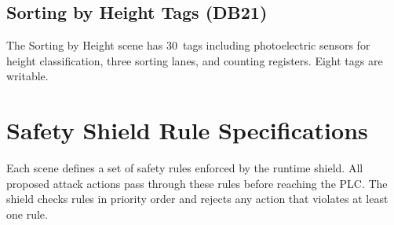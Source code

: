\subsection{Sorting by Height Tags (DB21)}
\label{subsec:appendix-tags-height}

The Sorting by Height scene has 30~tags including photoelectric sensors for height classification, three sorting lanes, and counting registers. Eight tags are writable.


\section{Safety Shield Rule Specifications}
\label{sec:appendix-shield}

Each scene defines a set of safety rules enforced by the runtime shield. All proposed attack actions pass through these rules before reaching the PLC. The shield checks rules in priority order and rejects any action that violates at least one rule.

\begin{table}[!t]
\centering
\caption{Safety rules for Level Control. All rules are enabled by default.}
\label{tab:rules-level-control}
\small
\setlength{\tabcolsep}{2pt}
\end{table}

